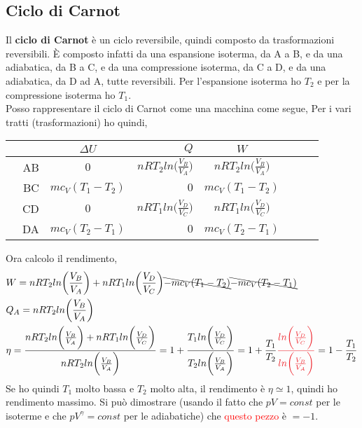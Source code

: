         \subsection{Ciclo di Carnot}
            Il \textbf{ciclo di Carnot} è un ciclo reversibile, quindi composto da trasformazioni reversibili. È composto infatti da una espansione isoterma, da A a B, e da una adiabatica, da B a C, e da una compressione isoterma, da C a D, e da una adiabatica, da D ad A, tutte reversibili. Per l'espansione isoterma ho $T_2$ e per la compressione isoterma ho $T_1$.\\
            Posso rappresentare il ciclo di Carnot come una macchina come segue,
            Per i vari tratti (trasformazioni) ho quindi,
            \begin{center}
                \begin{tabular}{|cr|cr|cr|cr|}
                    \hline
                    & \quad & $\Delta U$ & $Q$ & $W$\tabularnewline
                    \hline
                    & AB & $0$ & $nRT_2ln\bigg(\frac{V_B}{V_A}\bigg)$ & $nRT_2ln\bigg(\frac{V_B}{V_A}\bigg)$\tabularnewline
                    \hline
                    & BC & $mc_V(T_1 - T_2)$ & $0$ & $mc_V(T_1 - T_2)$\tabularnewline
                    \hline
                    & CD & $0$ & $nRT_1ln\bigg(\frac{V_D}{V_C}\bigg)$ & $nRT_1ln\bigg(\frac{V_D}{V_C}\bigg)$\tabularnewline
                    \hline
                    & DA & $mc_V(T_2 - T_1)$ & $0$ & $mc_V(T_2 - T_1)$\tabularnewline
                    \hline
                \end{tabular}
            \end{center}
            Ora calcolo il rendimento,
            \begin{align*}
                &W = nRT_2ln\bigg(\frac{V_B}{V_A}\bigg) + nRT_1ln\bigg(\frac{V_D}{V_C}\bigg) \bcancel{- mc_V(T_1 - T_2)} \bcancel{- mc_V(T_2 - T_1)}\\
                &Q_A = nRT_2ln\bigg(\frac{V_B}{V_A}\bigg)\\
                &\eta = \frac{nRT_2ln\bigg(\frac{V_B}{V_A}\bigg) + nRT_1ln\bigg(\frac{V_D}{V_C}\bigg)}{nRT_2ln\bigg(\frac{V_B}{V_A}\bigg)}=1 + \frac{ T_1ln\bigg(\frac{V_D}{V_C}\bigg)}{T_2ln\bigg(\frac{V_B}{V_A}\bigg)} = 1 + \frac{T_1}{T_2}\textcolor{Red}{\frac{ln\bigg(\frac{V_D}{V_C}\bigg)}{ln\bigg(\frac{V_B}{V_A}\bigg)}} = 1 - \frac{T_1}{T_2}
            \end{align*}
            Se ho quindi $T_1$ molto bassa e $T_2$ molto alta, il rendimento è $\eta\simeq 1$, quindi ho rendimento massimo. Si può dimostrare (usando il fatto che $pV=const$ per le isoterme e che $pV^\gamma = const$ per le adiabatiche) che \textcolor{Red}{questo pezzo} è $=-1$.

